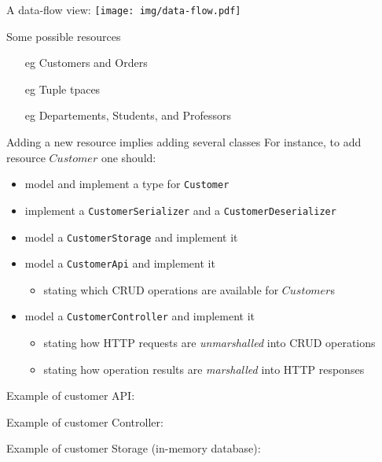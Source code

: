 \documentclass[presentation]{beamer}\mode<presentation>{\usetheme{AMSBolognaFC}}
\begin{document}
\begin{frame}[allowframebreaks]
    \framebreak

    A data-flow view:
    \texttt{[image: img/data-flow.pdf]}

    \framebreak

    \begin{exampleblock}{Some possible resources}
        \begin{itemize}
            \item[eg] Customers and Orders
            \item[eg] Tuple tpaces
            \item[eg] Departements, Students, and Professors
        \end{itemize}
    \end{exampleblock}

    \begin{alertblock}{Adding a new resource implies adding several classes}
        For instance, to add resource $Customer$ one should:
        \begin{itemize}
            \item model and implement a type for \texttt{Customer}
            \item implement a \texttt{CustomerSerializer} and a \texttt{CustomerDeserializer}
            \item model a \texttt{CustomerStorage} and implement it
            \item model a \texttt{CustomerApi} and implement it
            \begin{itemize}
                \item stating which CRUD operations are available for $Customer$s
            \end{itemize}
            \item model a \texttt{CustomerController} and implement it
            \begin{itemize}
                \item stating how HTTP requests are \emph{unmarshalled} into CRUD operations
                \item stating how operation results are \emph{marshalled} into HTTP responses
            \end{itemize}
        \end{itemize}
    \end{alertblock}

    \framebreak

    Example of customer API:
    

    \framebreak

    Example of customer Controller:
    

    \framebreak

    Example of customer Storage (in-memory database):
    

\end{frame}
\end{document}
